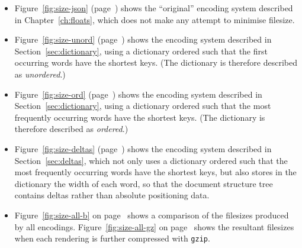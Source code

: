 \begin{itemize}

 \item Figure~\ref{fig:size-json} (page~\pageref{fig:size-json}) shows the ``original'' encoding system described in Chapter~\ref{ch:floats}, which does not make any attempt to minimise filesize.

 \item Figure~\ref{fig:size-unord} (page~\pageref{fig:size-unord}) shows the encoding system described in Section~\ref{sec:dictionary}, using a dictionary ordered such that the first occurring words have the shortest keys. (The dictionary is therefore described as \emph{unordered}.)

 \item Figure~\ref{fig:size-ord} (page~\pageref{fig:size-ord}) shows the encoding system described in Section~\ref{sec:dictionary}, using a dictionary ordered such that the most frequently occurring words have the shortest keys. (The dictionary is therefore described as \emph{ordered}.)

 \item Figure~\ref{fig:size-deltas} (page~\pageref{fig:size-deltas}) shows the encoding system described in Section~\ref{sec:deltas}, which not only uses a dictionary ordered such that the most frequently occurring words have the shortest keys, but also stores in the dictionary the width of each word, so that the document structure tree contains deltas rather than absolute positioning data.
 
 \item Figure~\ref{fig:size-all-b} on page~\pageref{fig:size-all-b} shows a comparison of the filesizes produced by all encodings. Figure~\ref{fig:size-all-gz} on page~\pageref{fig:size-all-gz} shows the resultant filesizes when each rendering is further compressed with \texttt{gzip}.
\end{itemize}



